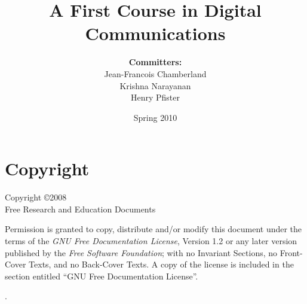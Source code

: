 \documentclass[12pt,openany]{book}
\begin{document}
\frontmatter

\author{
\textbf{Committers:} \\
Jean-Francois Chamberland \\
Krishna Narayanan \\
Henry Pfister}

\title{A First Course in Digital Communications}

\date{Spring 2010}

\maketitle

\chapter*{Copyright}
Copyright \copyright 2008 \\
Free Research and Education Documents

Permission is granted to copy, distribute and/or modify this document under the terms of the \emph{GNU Free Documentation License}, Version 1.2 or any later version published by the \emph{Free Software Foundation}; with no Invariant Sections, no Front-Cover Texts, and no Back-Cover Texts.
A copy of the license is included in the section entitled ``GNU Free Documentation License''.

\tableofcontents



.

\mainmatter








%

\appendix

%

%

\backmatter

\printindex
\end{document}
